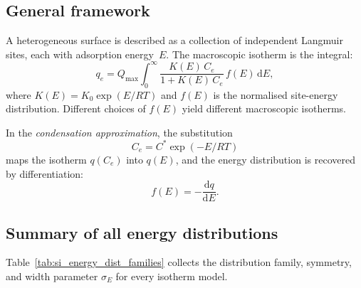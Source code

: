 \documentclass[journal=aamick,manuscript=article]{achemso}
\begin{document}
\subsection{General framework}
\label{sec:si_energy_framework}

A heterogeneous surface is described as a collection of independent
Langmuir sites, each with adsorption energy~$E$.  The macroscopic
isotherm is the integral:
\begin{equation}
	q_e = Q_{\max} \int_{0}^{\infty}
	\frac{K(E)\, C_e}{1 + K(E)\, C_e}\, f(E)\, \mathrm{d}E,
	\label{eq:si_heterogeneous_integral}
\end{equation}
where $K(E) = K_0\exp(E/RT)$ and $f(E)$ is the normalised site-energy
distribution.  Different choices of $f(E)$ yield different
macroscopic isotherms.

In the \emph{condensation approximation}, the substitution
\begin{equation}
	C_e = C^{\ast}\exp(-E/RT)
	\label{eq:si_condensation}
\end{equation}
maps the isotherm $q(C_e)$ into $q(E)$, and the energy distribution
is recovered by differentiation:
\begin{equation}
	f(E) = -\frac{\mathrm{d}q}{\mathrm{d}E}.
	\label{eq:si_fE_derivative}
\end{equation}

\subsection{Summary of all energy distributions}
\label{sec:si_dist_summary}

Table~\ref{tab:si_energy_dist_families} collects the distribution
family, symmetry, and width parameter $\sigma_E$ for every isotherm
model.
\end{document}
